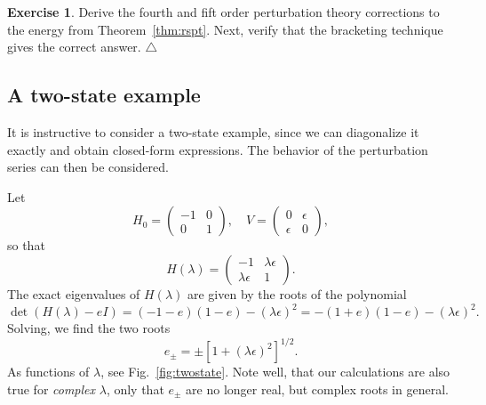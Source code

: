 \documentclass{report}
\theoremstyle{plain}
\theoremstyle{definition}
\newtheorem{exerc}{Exercise}[chapter]
\newcommand\xqed[1]{%
  \leavevmode\unskip\penalty9999 \hbox{}\nobreak\hfill
  \quad\hbox{#1}}
\newcommand\demo{\xqed{$\triangle$}}
\newenvironment{exercise}{\bigskip\begin{exerc}}{\demo\end{exerc}\bigskip}
\begin{document}
\begin{exercise}\label{exercise:pt-higher}
  Derive the fourth and fift order perturbation theory corrections to
  the energy from Theorem~\ref{thm:rspt}. Next, verify that the
  bracketing technique gives the correct answer.
\end{exercise}

\subsection{A two-state example}

It is instructive to consider a two-state example, since we can
diagonalize it exactly and obtain closed-form expressions. The
behavior of the perturbation series can then be considered.

Let
\begin{equation}
  H_0 = \begin{pmatrix} -1 & 0 \\ 0 & 1 \end{pmatrix}, \quad
  V = \begin{pmatrix} 0 & \epsilon \\ \epsilon & 0 \end{pmatrix},
\end{equation}
so that
\begin{equation}
  H(\lambda) = \begin{pmatrix} -1 & \lambda\epsilon \\ \lambda\epsilon
    & 1 \end{pmatrix}.
\end{equation}
The exact eigenvalues of $H(\lambda)$ are given by the roots of the polynomial
\begin{equation}
  \det(H(\lambda) - eI) = (-1-e)(1-e) - (\lambda\epsilon)^2 =
  -(1+e)(1-e) - (\lambda\epsilon)^2.
\end{equation}
Solving, we find the two roots
\begin{equation}
  e_{\pm} = \pm [1  + (\lambda\epsilon)^2]^{1/2}.
\end{equation}
As functions of $\lambda$, see Fig.~\ref{fig:twostate}. Note well,
that our calculations are also true for \emph{complex} $\lambda$, only
that $e_\pm$ are no longer real, but complex roots in general.
\end{document}
